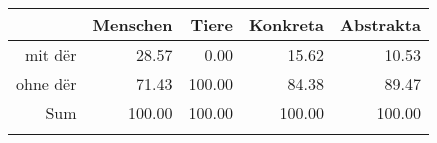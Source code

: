 \begin{tabular}{rrrrr}
  \lsptoprule
 & Menschen & Tiere & Konkreta & Abstrakta \\ 
  \midrule
mit dër & 28.57 & 0.00 & 15.62 & 10.53 \\ 
  ohne dër & 71.43 & 100.00 & 84.38 & 89.47 \\ 
  Sum & 100.00 & 100.00 & 100.00 & 100.00 \\ 
   \lspbottomrule
\end{tabular}
